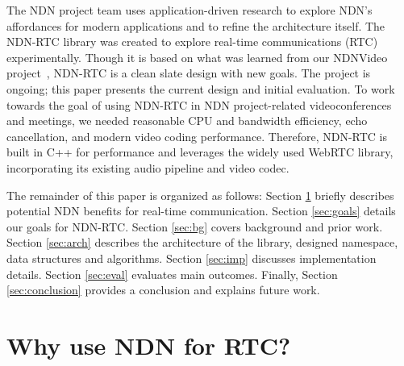 \documentclass{icn/sig-alternate-2013} %
\newcommand{\ndnrtcName}{NDN-RTC} %
\newcommand{\ndnconName}{\emph{ndncon}}
\begin{document}
The NDN project team uses application-driven research to explore NDN's affordances for modern applications and to refine the architecture itself.  %
The \ndnrtcName{} library was created to explore real-time communications (RTC) experimentally. %
Though it is based on what was learned from our NDNVideo project~\cite{ndnvideo}, \ndnrtcName{} is a clean slate design with new goals.  
The project is ongoing; this paper presents the current design and initial evaluation.  
To work towards the goal of using \ndnrtcName{} in NDN project-related videoconferences and meetings, we needed reasonable CPU and bandwidth efficiency, echo cancellation, and modern video coding performance. Therefore, \ndnrtcName{} is built in C++ for performance and leverages the widely used WebRTC library, incorporating its existing audio pipeline and video codec. 

The remainder of this paper is organized as follows: Section \ref{sec:why} briefly describes potential NDN benefits for real-time communication. Section \ref{sec:goals} details our goals for \ndnrtcName{}. Section \ref{sec:bg} covers background and prior work. Section \ref{sec:arch} describes the architecture of the library, designed namespace, data structures and algorithms. Section \ref{sec:imp} discusses implementation details. Section \ref{sec:eval} evaluates main outcomes. Finally, Section \ref{sec:conclusion} provides a conclusion and explains future work.


\section{Why use NDN for RTC?}
\label{sec:why}
\end{document}
